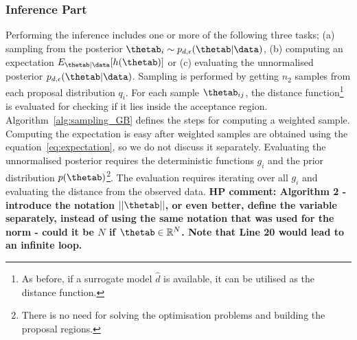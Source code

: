 \subsubsection*{Inference Part}
Performing the inference includes one or more of the following three
tasks; (a) sampling from the posterior
$ \thetab_i \sim p_{d, \epsilon}(\thetab|\data)$, (b) computing an
expectation $E_{\thetab|\data}[h(\thetab)]$ or (c) evaluating the
unnormalised posterior $p_{d, \epsilon}(\thetab|\data)$. Sampling is
performed by getting $n_2$ samples from each proposal distribution
$q_i$. For each sample $\thetab_{ij}$, the distance
function\footnote{As before, if a surrogate model $\hat{d}$ is
  available, it can be utilised as the distance function.} is
evaluated for checking if it lies inside the acceptance
region. Algorithm~\ref{alg:sampling_GB} defines the steps for
computing a weighted sample. Computing the expectation is easy after weighted 
samples are obtained using the equation~\ref{eq:expectation}, so we do not 
discuss it separately. Evaluating the unnormalised posterior requires the
deterministic functions $g_i$ and the prior distribution
$p(\thetab)$\footnote{There is no need for solving the optimisation
  problems and building the proposal regions.}. The evaluation
requires iterating over all $g_i$ and evaluating the distance from the
observed data. \textbf{HP comment: Algorithm 2 - introduce the notation $||\thetab||$, or even 
better, define the variable separately, instead of using the same notation 
that was used for the norm - could it be $N$ if $\thetab \in \mathbb{R}^N$. 
Note that Line 20 would lead to an infinite loop.}

